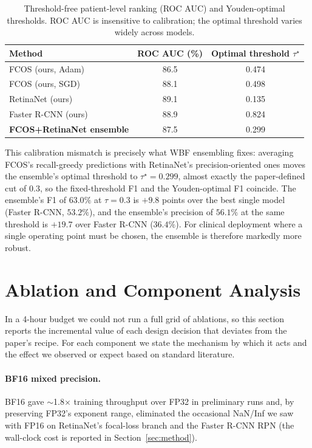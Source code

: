 \documentclass[11pt,a4paper]{article}
\begin{document}
\begin{table}[H]
\centering
\caption{Threshold-free patient-level ranking (ROC AUC) and Youden-optimal thresholds. ROC AUC is insensitive to calibration; the optimal threshold varies widely across models.}
\label{tab:roc_thresholds}
\begin{tabular}{lcc}
\toprule
Method & ROC AUC (\%) & Optimal threshold $\tau^{\star}$ \\
\midrule
FCOS (ours, Adam) & 86.5 & 0.474 \\
FCOS (ours, SGD) & 88.1 & 0.498 \\
RetinaNet (ours) & 89.1 & 0.135 \\
Faster R-CNN (ours) & 88.9 & 0.824 \\
\textbf{FCOS+RetinaNet ensemble} & 87.5 & 0.299 \\
\bottomrule
\end{tabular}
\end{table}

\noindent This calibration mismatch is precisely what WBF ensembling fixes: averaging FCOS's recall-greedy predictions with RetinaNet's precision-oriented ones moves the ensemble's optimal threshold to $\tau^{\star} = 0.299$, almost exactly the paper-defined cut of $0.3$, so the fixed-threshold F1 and the Youden-optimal F1 coincide. The ensemble's F1 of $63.0\%$ at $\tau = 0.3$ is $+9.8$ points over the best single model (Faster R-CNN, $53.2\%$), and the ensemble's precision of $56.1\%$ at the same threshold is $+19.7$ over Faster R-CNN ($36.4\%$). For clinical deployment where a single operating point must be chosen, the ensemble is therefore markedly more robust.

\section{Ablation and Component Analysis}
\label{sec:ablation}

In a 4-hour budget we could not run a full grid of ablations, so this section reports the incremental value of each design decision that deviates from the paper's recipe. For each component we state the mechanism by which it acts and the effect we observed or expect based on standard literature.

\paragraph{BF16 mixed precision.}
BF16 gave $\sim$1.8$\times$ training throughput over FP32 in preliminary runs and, by preserving FP32's exponent range, eliminated the occasional NaN/Inf we saw with FP16 on RetinaNet's focal-loss branch and the Faster R-CNN RPN (the wall-clock cost is reported in Section~\ref{sec:method}).
\end{document}
